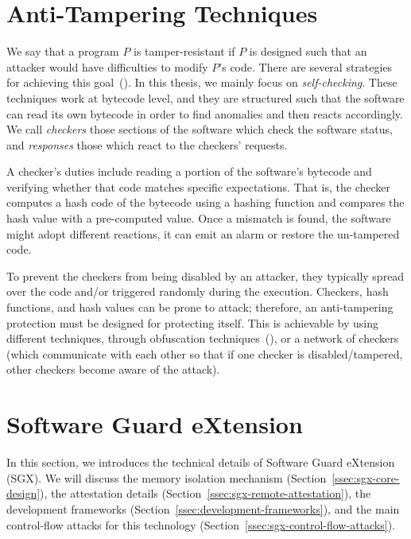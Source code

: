 
\section{Anti-Tampering Techniques}
\label{sec:anti-tampering-techniques}

We say that a program $P$ is tamper-resistant if $P$ is designed such that an 
attacker would have difficulties to modify $P$'s code.
There are several strategies for achieving this 
goal~(\cite{nagra2009surreptitious}).
In this thesis, we mainly focus on \emph{self-checking}.
These techniques work at bytecode level, and they are structured such that the 
software can read its own bytecode in order to find anomalies and then reacts 
accordingly.
We call \emph{checkers} those sections of the software which check the software 
status, and \emph{responses} those which react to the checkers' requests.

A checker's duties include reading a portion of the software's bytecode and 
verifying whether that code matches specific expectations. That is, the checker 
computes a hash code of the bytecode using a hashing function and compares the 
hash value with a pre-computed value. 
Once a mismatch is found, the software might adopt different reactions, \eg it 
can emit an alarm or restore the un-tampered code. 

To prevent the checkers from being disabled by an attacker, they typically 
spread over the code and/or triggered randomly during the execution.
Checkers, hash functions, and hash values can be prone to attack; therefore, an 
anti-tampering protection must be designed for protecting itself.
This is achievable by using different techniques,
\eg through obfuscation techniques~(\cite{banescu2017tutorial}), or a network 
of checkers (which communicate with each other so that if one checker is 
disabled/tampered, other checkers become aware of the attack).

\section{Software Guard eXtension}
\label{sec:software-guard-extension}

In this section, we introduces the technical details of Software Guard 
eXtension (SGX). We will discuss the memory isolation mechanism 
(Section~\ref{ssec:sgx-core-design}), the attestation details 
(Section~\ref{ssec:sgx-remote-attestation}), the development frameworks 
(Section~\ref{ssec:development-frameworks}), and the main control-flow attacks 
for this technology (Section~\ref{ssec:sgx-control-flow-attacks}).

